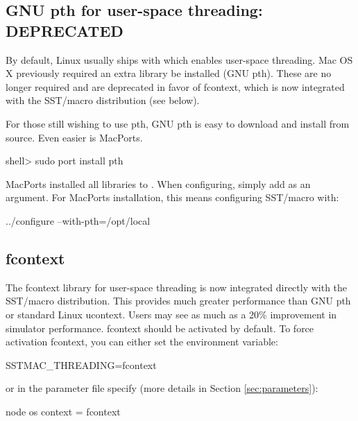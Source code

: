 
\subsection{GNU pth for user-space threading: DEPRECATED}\label{subsubsec:pth}
By default, Linux usually ships with  which enables user-space threading.
Mac OS X previously required an extra library be installed (GNU pth).
These are no longer required and are deprecated in favor of fcontext,
which is now integrated with the SST/macro distribution (see below).

For those still wishing to use pth, GNU pth is easy to download and install from source.
Even easier is MacPorts. 

\begin{ShellCmd}
shell> sudo port install pth
\end{ShellCmd}

MacPorts installed all libraries to . 
When configuring, simply add  as an argument.
For MacPorts installation, this means configuring SST/macro with:

\begin{ShellCmd}
../configure --with-pth=/opt/local
\end{ShellCmd}

\subsection{fcontext}\label{subsubsec:fcontext}
The fcontext library for user-space threading is now integrated directly with the SST/macro distribution.
This provides much greater performance than GNU pth or standard Linux ucontext.
Users may see as much as a 20\% improvement in simulator performance.
fcontext should be activated by default. To force activation fcontext, you can either set the environment variable:

\begin{ShellCmd}
SSTMAC_THREADING=fcontext
\end{ShellCmd}
or in the parameter file specify (more details in Section \ref{sec:parameters}):

\begin{ViFile}
node {
 os {
  context = fcontext
 }
}
\end{ViFile}

